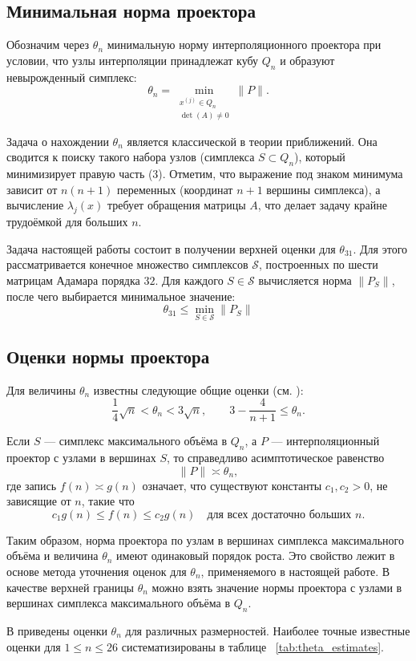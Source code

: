 \documentclass[a4paper,12pt]{article}
\theoremstyle{indented}
\begin{document}
\subsection{Минимальная норма проектора}

Обозначим через $\theta_n$ минимальную норму интерполяционного проектора при условии, что узлы интерполяции принадлежат кубу $Q_n$ и образуют невырожденный симплекс:
\[
\theta_n = \min_{\substack{x^{(j)} \in Q_n \\ \det(A) \neq 0}} \|P\|.
\]
\par
Задача о нахождении $\theta_n$ является классической в теории приближений. Она сводится к поиску такого набора узлов (симплекса $S \subset Q_n$), который минимизирует правую часть (3). Отметим, что выражение под знаком минимума зависит от $n(n+1)$ переменных (координат $n+1$ вершины симплекса), а вычисление $\lambda_j(x)$ требует обращения матрицы $A$, что делает задачу крайне трудоёмкой для больших $n$.
\par
Задача настоящей работы состоит в получении верхней оценки для $\theta_{31}$. Для этого рассматривается конечное множество симплексов $\mathcal{S}$, построенных по шести матрицам Адамара порядка $32$. Для каждого $S \in \mathcal{S}$ вычисляется норма $\|P_S\|$, после чего выбирается минимальное значение:
\[
\theta_{31} \le \min_{S \in \mathcal{S}} \|P_S\|
\]

\subsection{Оценки нормы проектора}

Для величины $\theta_n$ известны следующие общие оценки (см. \cite{nevsky_geo}):
\[
\frac{1}{4}\sqrt{n} < \theta_n < 3\sqrt{n}, \qquad 3 - \frac{4}{n+1} \le \theta_n.
\]

Если $S$ — симплекс максимального объёма в $Q_n$, а $P$ — интерполяционный проектор с узлами в вершинах $S$, то справедливо асимптотическое равенство
\[
\|P\| \asymp \theta_n,
\]
где запись $f(n) \asymp g(n)$ означает, что существуют константы $c_1, c_2 > 0$, не зависящие от $n$, такие что
\[
c_1 g(n) \le f(n) \le c_2 g(n) \quad \text{для всех достаточно больших } n.
\]

Таким образом, норма проектора по узлам в вершинах симплекса максимального объёма и величина $\theta_n$ имеют одинаковый порядок роста. Это свойство лежит в основе метода уточнения оценок для $\theta_n$, применяемого в настоящей работе. В качестве верхней границы $\theta_n$ можно взять значение нормы проектора с узлами в вершинах симплекса максимального объёма в $Q_n$.
\par
В \cite{nevsky_ukhalov_sel_problems} приведены оценки $\theta_n$ для различных размерностей. Наиболее точные известные оценки для $1 \le n \le 26$ систематизированы в таблице ~\ref{tab:theta_estimates}.
\end{document}
